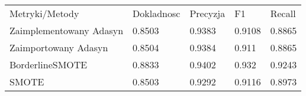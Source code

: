 \begin{tabular}{lllll}
\hline
 Metryki/Metody          & Dokladnosc & Precyzja & F1     & Recall \\
 Zaimplementowany Adasyn & 0.8503     & 0.9383   & 0.9108 & 0.8865 \\
 Zaimportowany Adasyn    & 0.8504     & 0.9384   & 0.911  & 0.8865 \\
 BorderlineSMOTE         & 0.8833     & 0.9402   & 0.932  & 0.9243 \\
 SMOTE                   & 0.8503     & 0.9292   & 0.9116 & 0.8973 \\
\hline
\end{tabular}